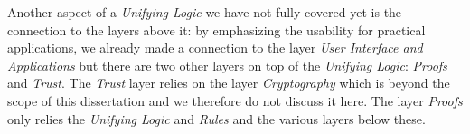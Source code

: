  Another aspect of a \emph{Unifying Logic} we have not fully covered yet is the connection to the layers above it: by emphasizing the usability for practical applications, 
 we already made a connection 
 to the layer \emph{User Interface and Applications} but there are two other layers on top of the \emph{Unifying Logic}: \emph{Proofs} and \emph{Trust}. 
 The \emph{Trust} layer relies 
 on the layer \emph{Cryptography} which is beyond the scope of this dissertation and we therefore do not discuss it here. 
 The layer \emph{Proofs} only relies 
the \emph{Unifying Logic} and \emph{Rules} and the various layers below these. 
%
